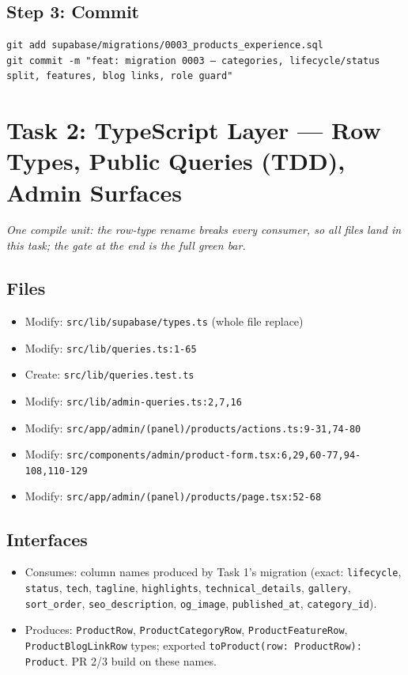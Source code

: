 \documentclass[11pt,a4paper]{article}
\begin{document}
\subsection*{Step 3: Commit}

\begin{lstlisting}
git add supabase/migrations/0003_products_experience.sql
git commit -m "feat: migration 0003 — categories, lifecycle/status split, features, blog links, role guard"
\end{lstlisting}

\section{Task 2: TypeScript Layer --- Row Types, Public Queries (TDD), Admin Surfaces}

\emph{One compile unit: the row-type rename breaks every consumer, so all files land in this
task; the gate at the end is the full green bar.}

\subsection*{Files}
\begin{itemize}
  \item Modify: \texttt{src/lib/supabase/types.ts} (whole file replace)
  \item Modify: \texttt{src/lib/queries.ts:1-65}
  \item Create: \texttt{src/lib/queries.test.ts}
  \item Modify: \texttt{src/lib/admin-queries.ts:2,7,16}
  \item Modify: \texttt{src/app/admin/(panel)/products/actions.ts:9-31,74-80}
  \item Modify: \texttt{src/components/admin/product-form.tsx:6,29,60-77,94-108,110-129}
  \item Modify: \texttt{src/app/admin/(panel)/products/page.tsx:52-68}
\end{itemize}

\subsection*{Interfaces}
\begin{itemize}
  \item Consumes: column names produced by Task 1's migration (exact: \texttt{lifecycle},
        \texttt{status}, \texttt{tech}, \texttt{tagline}, \texttt{highlights},
        \texttt{technical\_details}, \texttt{gallery}, \texttt{sort\_order},
        \texttt{seo\_description}, \texttt{og\_image}, \texttt{published\_at},
        \texttt{category\_id}).
  \item Produces: \texttt{ProductRow}, \texttt{ProductCategoryRow}, \texttt{ProductFeatureRow},
        \texttt{ProductBlogLinkRow} types; exported \texttt{toProduct(row: ProductRow): Product}.
        PR 2/3 build on these names.
\end{itemize}
\end{document}

